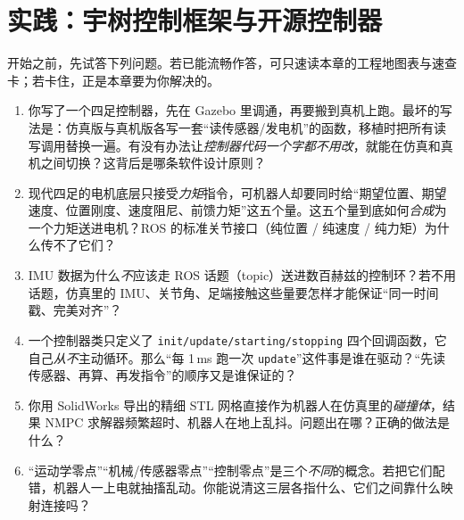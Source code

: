 \chapter{实践：宇树控制框架与开源控制器}
\label{ch:quad_prac}



\begin{practice}[前置自测]
开始之前，先试答下列问题。若已能流畅作答，可只速读本章的工程地图表与速查卡；若卡住，正是本章要为你解决的。
\begin{enumerate}
  \item 你写了一个四足控制器，先在 Gazebo 里调通，再要搬到真机上跑。最坏的写法是：仿真版与真机版各写一套“读传感器/发电机”的函数，移植时把所有读写调用替换一遍。有没有办法让\emph{控制器代码一个字都不用改}，就能在仿真和真机之间切换？这背后是哪条软件设计原则？
  \item 现代四足的电机底层只接受\emph{力矩}指令，可机器人却要同时给“期望位置、期望速度、位置刚度、速度阻尼、前馈力矩”这五个量。这五个量到底如何\emph{合成}为一个力矩送进电机？ROS 的标准关节接口（纯位置 / 纯速度 / 纯力矩）为什么传不了它们？
  \item IMU 数据为什么\emph{不}应该走 ROS 话题（topic）送进数百赫兹的控制环？若不用话题，仿真里的 IMU、关节角、足端接触这些量要怎样才能保证“同一时间戳、完美对齐”？
  \item 一个控制器类只定义了 \texttt{init/\allowbreak update/\allowbreak starting/\allowbreak stopping} 四个回调函数，它自己\emph{从不}主动循环。那么“每 1\,ms 跑一次 \texttt{update}”这件事是谁在驱动？“先读传感器、再算、再发指令”的顺序又是谁保证的？
  \item 你用 SolidWorks 导出的精细 STL 网格直接作为机器人在仿真里的\emph{碰撞体}，结果 NMPC 求解器频繁超时、机器人在地上乱抖。问题出在哪？正确的做法是什么？
  \item “运动学零点”“机械/传感器零点”“控制零点”是三个\emph{不同}的概念。若把它们配错，机器人一上电就抽搐乱动。你能说清这三层各指什么、它们之间靠什么映射连接吗？
\end{enumerate}
\end{practice}

